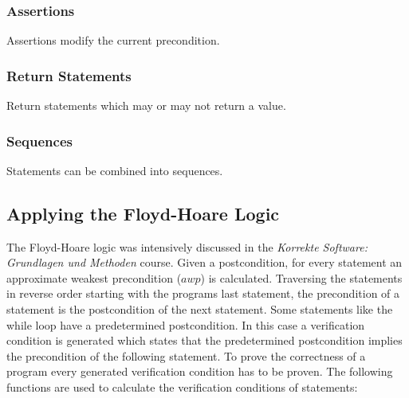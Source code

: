 \documentclass[12pt]{article}
\begin{document}
\subsubsection*{Assertions}
Assertions modify the current precondition.

\subsubsection*{Return Statements}
Return statements which may or may not return a value.

\subsubsection*{Sequences}
Statements can be combined into sequences.

\subsection{Applying the Floyd-Hoare Logic}

The Floyd-Hoare logic was intensively discussed in the \emph{Korrekte Software: Grundlagen und Methoden} course. 
Given a postcondition, for every statement an approximate weakest precondition ($awp$) is calculated.
Traversing the statements in reverse order starting with the programs last statement, the precondition of a statement is the postcondition of the next statement.
Some statements like the while loop have a predetermined postcondition.
In this case a verification condition is generated which states that the predetermined postcondition implies the precondition of the following statement.
To prove the correctness of a program every generated verification condition has to be proven.
The following functions are used to calculate the verification conditions of statements:
\end{document}
